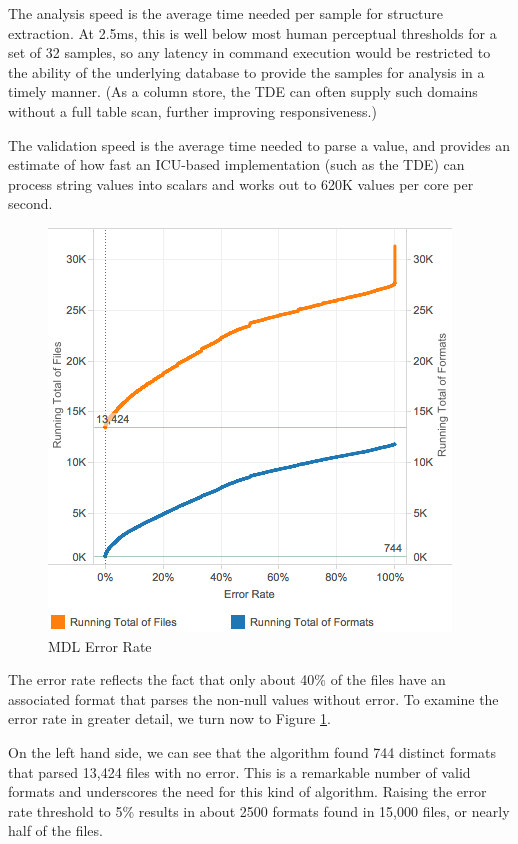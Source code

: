 The analysis speed is the average time needed per sample for structure extraction. At 2.5ms, this is well below most human perceptual thresholds for a set of 32 samples, so any latency in command execution would be restricted to the ability of the underlying database to provide the samples for analysis in a timely manner. (As a column store, the TDE can often supply such domains without a full table scan, further improving responsiveness.) 

The validation speed is the average time needed to parse a value, and provides an estimate of how fast an ICU-based implementation (such as the TDE) can process string values into scalars and works out to 620K values per core per second.
 
\begin{figure}[ht]
\centering
\includegraphics[width=\columnwidth]{figures/FigureM2}
\caption{MDL Error Rate}
\label{fig:M2}
\end{figure}


The error rate reflects the fact that only about 40\% of the files have an associated format that parses the non-null values without error. To examine the error rate in greater detail, we turn now to Figure \ref{fig:M2}.

On the left hand side, we can see that the algorithm found 744 distinct formats that parsed 13,424 files with no error. This is a remarkable number of valid formats and underscores the need for this kind of algorithm. Raising the error rate threshold to 5\% results in about 2500 formats found in 15,000 files, or nearly half of the files. 

